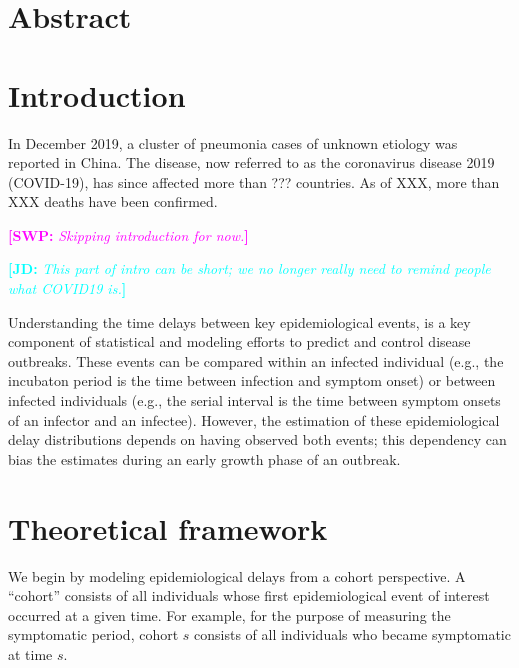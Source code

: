 \documentclass[12pt]{article}
\date{\today}
\newcommand{\comment}[3]{\textcolor{#1}{\textbf{[#2: }\textsl{#3}\textbf{]}}}
\newcommand{\jd}[1]{\comment{cyan}{JD}{#1}}
\newcommand{\swp}[1]{\comment{magenta}{SWP}{#1}}
\begin{document}
\begin{flushleft}{
	\Large
	\textbf{}
}
\end{flushleft}

\section*{Abstract}

\pagebreak

\section{Introduction}

In December 2019, a cluster of pneumonia cases of unknown etiology was reported in China.
The disease, now referred to as the coronavirus disease 2019 (COVID-19), has since affected more than ??? countries.
As of XXX, more than XXX deaths have been confirmed.

\swp{Skipping introduction for now.}

\jd{This part of intro can be short; we no longer really need to remind people what COVID19 is.}

Understanding the time delays between key epidemiological events, is a key component of statistical and modeling efforts to predict and control disease outbreaks. 
These events can be compared within an infected individual (e.g., the incubaton period is the time between infection and symptom onset) or between infected individuals (e.g., the serial interval is the time between symptom onsets of an infector and an infectee).
However, the estimation of these epidemiological delay distributions depends on having observed both events;
this dependency can bias the estimates during an early growth phase of an outbreak.

\section{Theoretical framework}

We begin by modeling epidemiological delays from a cohort perspective.
A ``cohort'' consists of all individuals whose first epidemiological event of interest occurred at a given time.
For example, for the purpose of measuring the symptomatic period, cohort $s$ consists of all individuals who became symptomatic at time $s$.
\end{document}
